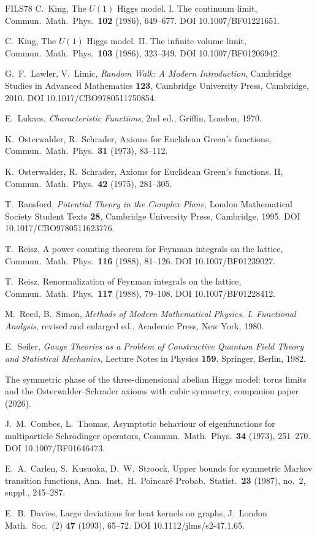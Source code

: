 \begin{thebibliography}{FILS78}
 C.~King, The $U(1)$ Higgs model. I. The continuum limit, Commun.\ Math.\ Phys.\ \textbf{102} (1986), 649--677. DOI 10.1007/BF01221651.

 C.~King, The $U(1)$ Higgs model. II. The infinite volume limit, Commun.\ Math.\ Phys.\ \textbf{103} (1986), 323--349. DOI 10.1007/BF01206942.

 G.~F.~Lawler, V.~Limic, \emph{Random Walk: A Modern Introduction}, Cambridge Studies in Advanced Mathematics \textbf{123}, Cambridge University Press, Cambridge, 2010. DOI 10.1017/CBO9780511750854.

 E.~Lukacs, \emph{Characteristic Functions}, 2nd ed., Griffin, London, 1970.

 K.~Osterwalder, R.~Schrader, Axioms for Euclidean Green's functions, Commun.\ Math.\ Phys.\ \textbf{31} (1973), 83--112.

 K.~Osterwalder, R.~Schrader, Axioms for Euclidean Green's functions. II, Commun.\ Math.\ Phys.\ \textbf{42} (1975), 281--305.

 T.~Ransford, \emph{Potential Theory in the Complex Plane}, London Mathematical Society Student Texts \textbf{28}, Cambridge University Press, Cambridge, 1995. DOI 10.1017/CBO9780511623776.

 T.~Reisz, A power counting theorem for Feynman integrals on the lattice, Commun.\ Math.\ Phys.\ \textbf{116} (1988), 81--126. DOI 10.1007/BF01239027.

 T.~Reisz, Renormalization of Feynman integrals on the lattice, Commun.\ Math.\ Phys.\ \textbf{117} (1988), 79--108. DOI 10.1007/BF01228412.

 M.~Reed, B.~Simon, \emph{Methods of Modern Mathematical Physics. I. Functional Analysis}, revised and enlarged ed., Academic Press, New York, 1980.

 E.~Seiler, \emph{Gauge Theories as a Problem of Constructive Quantum Field Theory and Statistical Mechanics}, Lecture Notes in Physics \textbf{159}, Springer, Berlin, 1982.

 The symmetric phase of the three-dimensional abelian Higgs model: torus limits and the Osterwalder--Schrader axioms with cubic symmetry, companion paper (2026).

 J.~M.~Combes, L.~Thomas, Asymptotic behaviour of eigenfunctions for multiparticle Schr\"odinger operators, Commun.\ Math.\ Phys.\ \textbf{34} (1973), 251--270. DOI 10.1007/BF01646473.

 E.~A.~Carlen, S.~Kusuoka, D.~W.~Stroock, Upper bounds for symmetric Markov transition functions, Ann.\ Inst.\ H.~Poincar\'e Probab.\ Statist.\ \textbf{23} (1987), no.~2, suppl., 245--287.

 E.~B.~Davies, Large deviations for heat kernels on graphs, J.\ London Math.\ Soc.\ (2) \textbf{47} (1993), 65--72. DOI 10.1112/jlms/s2-47.1.65.

\end{thebibliography}
